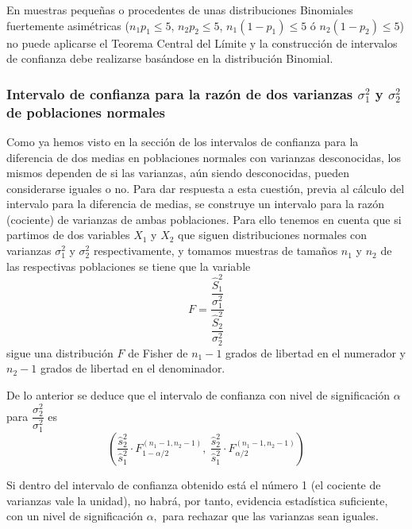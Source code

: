 En muestras pequeñas o procedentes de unas distribuciones Binomiales fuertemente asimétricas ($n_1p_1\leq 5$, $n_2p_2\leq
5$, $n_1(1-p_1)\leq 5$ ó $n_2(1-p_2)\leq 5$) no puede aplicarse el Teorema Central del Límite y la construcción de
intervalos de confianza debe realizarse basándose en la distribución Binomial.

\subsubsection{Intervalo de confianza para la razón de dos varianzas $\sigma _{1}^{2}$ y $\sigma _{2}^{2}$ de
poblaciones normales}

Como ya hemos visto en la sección de los intervalos de confianza para la diferencia de dos medias en poblaciones normales
con varianzas desconocidas, los mismos dependen de si las varianzas, aún siendo desconocidas, pueden considerarse iguales
o no. Para dar respuesta a esta cuestión, previa al cálculo del intervalo para la diferencia de medias, se construye un
intervalo para la razón (cociente) de varianzas de ambas poblaciones. Para ello tenemos en cuenta que si partimos de dos
variables $X_{1}$ y $X_{2}$ que siguen distribuciones normales con varianzas $\sigma_{1}^{2}$ y $\sigma_{2}^{2}$
respectivamente, y tomamos muestras de tamaños $n_{1}$ y $n_{2}$ de las respectivas poblaciones se tiene que la variable
\[
F= \dfrac{\dfrac{\hat S_{1}^{2}}{\sigma_{1}^{2}}}{\dfrac{\hat S_{2}^{2}}{\sigma_{2}^{2}}}
\]
sigue una distribución $F$ de Fisher de $n_{1}-1$ grados de libertad en el numerador y $n_{2}-1$ grados de libertad en
el denominador.

De lo anterior se deduce que el intervalo de confianza con nivel de significación $\alpha$ para $\dfrac{\sigma
_{2}^{2}}{\sigma _{1}^{2}}$ es
\[
\left( \dfrac{\hat s_{2}^{2}}{\hat s_{1}^{2}}\cdot F_{1-\alpha
/2}^{\left( n_{1}-1,n_{2}-1\right) },\ \dfrac{\hat s_{2}^{2}}{
\hat s_{1}^{2}}\cdot F_{\alpha /2}^{\left(n_{1}-1,n_{2}-1\right) }\right)
\]

Si dentro del intervalo de confianza obtenido está el número 1 (el cociente de varianzas vale la unidad), no habrá, por
tanto, evidencia estadística suficiente, con un nivel de significación $\alpha ,$ para rechazar que las varianzas sean
iguales.

\clearpage
\newpage


